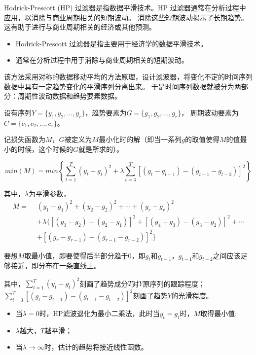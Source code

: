 \documentclass[a4paper,AutoFakeBold,AutoFakeSlant]{ctexart}
\begin{document}
Hodrick-Prescott (HP) 过滤器是指数据平滑技术。HP 过滤器通常在分析过程中应用，以消除与商业周期相关的短期波动。
消除这些短期波动揭示了长期趋势。这有助于进行与商业周期相关的经济或其他预测。\cite{Hodrick-Prescott(HP)过滤器是指数据平滑技术}

\begin{itemize}
  \item Hodrick-Prescott 过滤器是指主要用于经济学的数据平滑技术。
  \item 通常在分析过程中用于消除与商业周期相关的短期波动。
\end{itemize}

该方法采用对称的数据移动平均的方法原理，设计滤波器，将变化不定的时间序列数据中具有一定趋势变化的平滑序列分离出来。
于是时间序列数据就被分为两部分：周期性波动数据和趋势要素数据。

设有序列$ Y = \{y_1, y_2, ..., y_r\} $，趋势要素为$ G = \{g_1, g_2,..., g_r\} $，
周期波动要素为$ C = \{c_1,c_2,..., c_r\} $。

记损失函数为$ M $，$ G $被定义为$ M $最小化时的解（即当一系列$ g $的取值使得$ M $的值最小的时候，这个时候的$ G $就是所求的）。

\begin{equation}
  min(M) = min \left\{\sum_{t=1}^{T}(y_t-g_t)^2 + \lambda \sum_{t=3}^{T} \left[(g_t-g_{t-1}) - (g_{t-1}-g_{t-2})\right]^2 \right\}
\end{equation}

其中，$\lambda$为平滑参数，
\begin{equation}
  \begin{aligned}
    M = \ \ &(y_1-g_1)^2 + (y_2-g_2)^2 + \cdots + (y_r-g_r)^2 \\
        & + \lambda \{\left[(g_{3}-g_{2}) - (g_{2}-g_{1})\right]^2 + \left[(g_{4}-g_{3}) - (g_{3}-g_{2})\right]^2 + \cdots\\
        & + \left[(g_{r}-g_{r-1}) - (g_{r-1}-g_{r-2})\right]^2 \} 
  \end{aligned}
\end{equation}

要想$M$取最小值，即要使得后半部分趋于0，即$g_t$和$g_{t-1}$，$g_{t-1}$和$g_{t-2}$之间应该足够接近，即分布在一条直线上。

其中，$ \sum_{t=1}^{T}(y_t-g_t)^2 $刻画了趋势成分$T$对$Y$原序列的跟踪程度；\\
$ \sum_{t=3}^{T} \left[(g_t-g_{t-1}) - (g_{t-1}-g_{t-2})\right]^2 $刻画了趋势$Y$的光滑程度。

\begin{itemize}
  \item 当$\lambda = 0$时，HP滤波退化为最小二乘法，此时当$ y_t = g_t $时，$ M $取得最小值;
  \item $ \lambda $越大，$ T $越平滑；
  \item 当$\lambda \rightarrow \infty$时，估计的趋势将接近线性函数。
\end{itemize}
\end{document}
